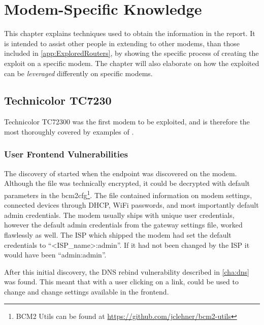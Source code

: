 \chapter{Modem-Specific Knowledge}
\label{app:howto}
This chapter explains techniques used to obtain the information in the report.
It is intended to assist other people in extending \exploitname{} to other modems, than those included in \cref{app:ExploredRouters}, by showing the specific process of creating the exploit on a specific modem.
The chapter will also elaborate on how the exploited can be \textit{leveraged} differently on specific modems.

\section{Technicolor TC7230}
\label{sec:technicolorTC7230}
Technicolor TC72300 was the first modem to be exploited, and is therefore the most thoroughly covered by examples of \exploitname{}.

\subsection{User Frontend Vulnerabilities}
\label{subsec:userFrontendVulnerabilities}
The discovery of \exploitname{} started when the endpoint  was discovered on the modem.
Although the file was technically encrypted, it could be decrypted with default parameters in the bcm2cfg\footnote{BCM2 Utils can be found at \url{https://github.com/jclehner/bcm2-utils}}.
The file contained information on modem settings, connected devices through DHCP, WiFi passwords, and most importantly default admin credentials.
The modem usually ships with unique user credentials, however the default admin credentials from the gateway settings file, worked flawlessly as well.
The ISP which shipped the modem had set the default credentials to \enquote{<ISP\_name>:admin}.
If it had not been changed by the ISP it would have been \enquote{admin:admin}.

After this initial discovery, the DNS rebind vulnerability described in \cref{cha:dns} was found.
This meant that with a user clicking on a link, could be used to change and change settings available in the frontend.

